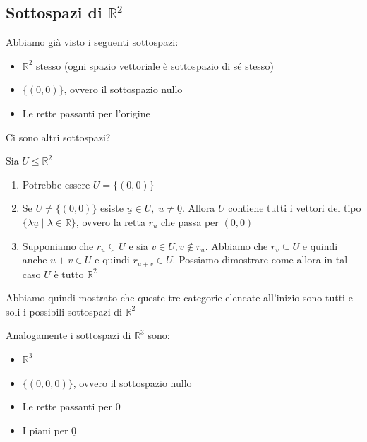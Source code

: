 \documentclass[
  a4paper,
]{article}
\providecommand{\tightlist}{%
  \setlength{\itemsep}{0pt}\setlength{\parskip}{0pt}}
\providecommand{\tightlist}{}
\begin{document}
\hypertarget{sottospazi-di-mathbbr2}{%
\subsection{\texorpdfstring{Sottospazi di
\(\mathbb{R}^2\)}{Sottospazi di \textbackslash mathbb\{R\}\^{}2}}\label{sottospazi-di-mathbbr2}}

Abbiamo già visto i seguenti sottospazi:

\begin{itemize}
\tightlist
\item
  \(\mathbb{R}^2\) stesso (ogni spazio vettoriale è sottospazio di sé
  stesso)
\item
  \(\{(0,0)\}\), ovvero il sottospazio nullo
\item
  Le rette passanti per l'origine
\end{itemize}

Ci sono altri sottospazi?

Sia \(U \leq \mathbb{R}^2\)

\begin{enumerate}
\def\labelenumi{\arabic{enumi}.}
\tightlist
\item
  Potrebbe essere \(U = \{(0, 0)\}\)
\item
  Se \(U \not = \{(0, 0)\}\) esiste
  \(\underline u \in U ,\; u \not = \underline 0\). Allora \(U\)
  contiene tutti i vettori del tipo
  \(\{\lambda \underline u \mid \lambda \in \mathbb{R}\}\), ovvero la
  retta \(r_u\) che passa per \((0, 0)\)
\item
  Supponiamo che \(r_u \subsetneq U\) e sia
  \(\underline v \in U , \underline v \not \in r_u\). Abbiamo che
  \(r_v \subseteq U\) e quindi anche
  \(\underline u + \underline v \in U\) e quindi \(r_{u + v} \in U\).
  Possiamo dimostrare come allora in tal caso \(U\) è tutto
  \(\mathbb{R}^2\)
\end{enumerate}

Abbiamo quindi mostrato che queste tre categorie elencate all'inizio
sono tutti e soli i possibili sottospazi di \(\mathbb{R}^2\)

Analogamente i sottospazi di \(\mathbb{R}^3\) sono:

\begin{itemize}
\tightlist
\item
  \(\mathbb{R}^3\)
\item
  \(\{(0,0,0)\}\), ovvero il sottospazio nullo
\item
  Le rette passanti per \(\underline 0\)
\item
  I piani per \(\underline 0\)
\end{itemize}
\end{document}
